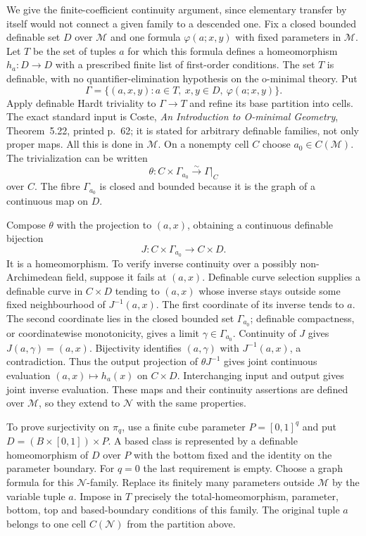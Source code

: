 We give the finite-coefficient continuity argument, since elementary
transfer by itself would not connect a given family to a descended one.
Fix a closed bounded definable set $D$ over $\mathcal M$ and one formula
$\varphi(a;x,y)$ with fixed parameters in $\mathcal M$. Let $T$ be the
set of tuples $a$ for which this formula defines a homeomorphism
$h_a:D\to D$ with a prescribed finite list of first-order conditions.
The set $T$ is definable, with no quantifier-elimination hypothesis on
the o-minimal theory. Put
\[
 \Gamma=\{(a,x,y):a\in T,\ x,y\in D,\ \varphi(a;x,y)\}.
\]
Apply definable Hardt triviality to $\Gamma\to T$ and refine its base
partition into cells. The exact standard input is Coste,
\emph{An Introduction to O-minimal Geometry}, Theorem~5.22,
printed p.~62; it is stated for arbitrary definable families, not
only proper maps. All this is done in $\mathcal M$. On a nonempty
cell $C$ choose $a_0\in C(\mathcal M)$. The trivialization can be
written
\[
 \theta:C\times\Gamma_{a_0}\xrightarrow{\sim}\Gamma|_C
\]
over $C$. The fibre $\Gamma_{a_0}$ is closed and bounded because it is
the graph of a continuous map on $D$.

Compose $\theta$ with the projection to $(a,x)$, obtaining a continuous
definable bijection
\[
 J:C\times\Gamma_{a_0}\longrightarrow C\times D.
\]
It is a homeomorphism. To verify inverse continuity over a possibly
non-Archimedean field, suppose it fails at $(a,x)$. Definable curve
selection supplies a definable curve in $C\times D$ tending to $(a,x)$
whose inverse stays outside some fixed neighbourhood of
$J^{-1}(a,x)$. The first coordinate of its inverse tends to $a$.
The second coordinate lies in the closed bounded set $\Gamma_{a_0}$;
definable compactness, or coordinatewise monotonicity, gives a limit
$\gamma\in\Gamma_{a_0}$. Continuity of $J$ gives
$J(a,\gamma)=(a,x)$. Bijectivity identifies $(a,\gamma)$ with
$J^{-1}(a,x)$, a contradiction. Thus the output projection of
$\theta J^{-1}$ gives joint continuous evaluation
$(a,x)\mapsto h_a(x)$ on $C\times D$.
Interchanging input and output gives joint inverse evaluation.
These maps and their continuity assertions are defined over
$\mathcal M$, so they extend to $\mathcal N$ with the same properties.

To prove surjectivity on $\pi_q$, use a finite cube parameter
$P=[0,1]^q$ and put $D=(B\times[0,1])\times P$.
A based class is represented by a definable homeomorphism of $D$ over
$P$ with the bottom fixed and the identity on the parameter boundary.
For $q=0$ the last requirement is empty. Choose a graph formula for
this $\mathcal N$-family. Replace its finitely many parameters outside
$\mathcal M$ by the variable tuple $a$. Impose in $T$ precisely the
total-homeomorphism, parameter, bottom, top and based-boundary
conditions of this family. The original tuple $a$ belongs to one cell
$C(\mathcal N)$ from the partition above.


